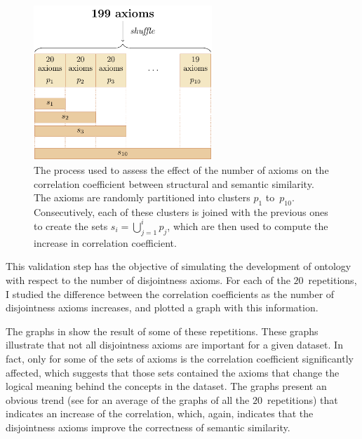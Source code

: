 \begin{figure}
    \centering
    \includegraphics[width=0.6\textwidth]{images/partition.pdf}
    \caption[Partitioning the set of disjointness axioms]{The process used to assess the effect of the number of axioms on the correlation coefficient between structural and semantic similarity. The axioms are randomly partitioned into clusters $p_1$ to~$p_{10}$. Consecutively, each of these clusters is joined with the previous ones to create the sets $s_i = \bigcup_{j=1}^i p_j$, which are then used to compute the increase in correlation coefficient.}
    \label{fig:partitions}
\end{figure}

This validation step has the objective of simulating the development of  ontology with respect to the number of disjointness axioms. For each of the $20$~repetitions, I studied the difference between the correlation coefficients as the number of disjointness axioms increases, and plotted a graph with this information.

The graphs in  show the result of some of these repetitions. These graphs illustrate that not all disjointness axioms are important for a given dataset. In fact, only for some of the sets of axioms is the correlation coefficient significantly affected, which suggests that those sets contained the axioms that change the logical meaning behind the concepts in the dataset. The graphs present an obvious trend (see  for an average of the graphs of all the $20$~repetitions) that indicates an increase of the correlation, which, again, indicates that the disjointness axioms improve the correctness of semantic similarity.


